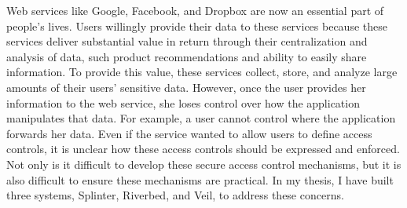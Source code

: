 % 
% 
%

Web services like Google, Facebook, and Dropbox are now an essential part of people’s lives. Users
willingly provide their data to these services because these services deliver substantial value in return
through their centralization and analysis of data, such product recommendations and ability to easily
share information. To provide this value, 
these services collect, store, and analyze large amounts of their users’ sensitive
data. However, once the user provides her information to the web service, she loses control over how the
application manipulates that data. For example, a user cannot control where the application forwards
her data. Even if the service wanted to allow users to define access controls, it is unclear how these access
controls should be expressed and enforced. Not only is it difficult to develop these secure access control
mechanisms, but it is also difficult to ensure these mechanisms are practical. In my thesis,
I have built three systems, Splinter, Riverbed, and Veil, to address these concerns.